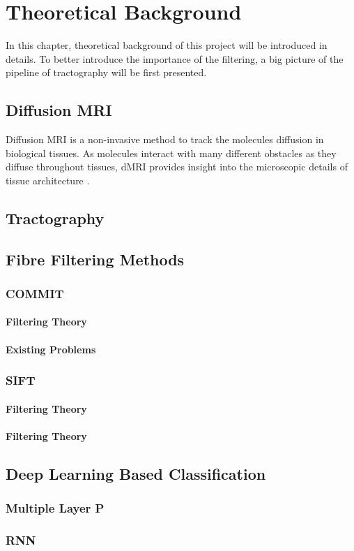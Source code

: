 \chapter{Theoretical Background}


In this chapter, theoretical background of this project will be introduced in details. To better introduce the importance of the filtering, a big picture of the pipeline of tractography will be first presented. 

\section{Diffusion MRI}

Diffusion MRI is a non-invasive method to track the molecules diffusion in biological tissues. As molecules interact with many different obstacles as they diffuse throughout tissues, dMRI provides insight into the microscopic details of tissue architecture \cite{newman_chapter_2014}. 

\section{Tractography}



\section{Fibre Filtering Methods}

\subsection{COMMIT}

\subsubsection{Filtering Theory}

\subsubsection{Existing Problems}

\subsection{SIFT}

\subsubsection{Filtering Theory}

\subsubsection{Filtering Theory}

\section{Deep Learning Based Classification}

\subsection{Multiple Layer P}
\subsection{RNN}




